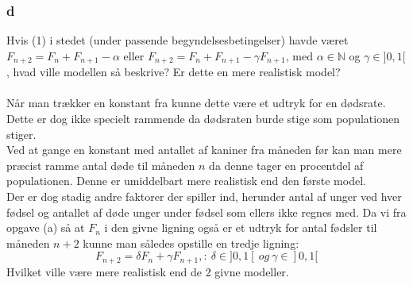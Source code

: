 \documentclass[12pt]{article}
\begin{document}
\subsubsection*{d}
Hvis (1) i stedet (under passende begyndelsesbetingelser) havde været $F_{n+2}=F_n+F_{n+1}-\alpha$ eller $F_{n+2}=F_n+F_{n+1}-\gamma F_{n+1}$, med $\alpha\in \mathbb{N}$ og $\gamma\in ]0,1[$, hvad ville modellen så beskrive? Er dette en mere realistisk model?\\
\\
Når man trækker en konstant fra kunne dette være et udtryk for en dødsrate. Dette er dog ikke specielt rammende da dødsraten burde stige som populationen stiger.\\
Ved at gange en konstant med antallet af kaniner fra måneden før kan man mere præcist ramme antal døde til måneden $n$ da denne tager en procentdel af populationen. Denne er umiddelbart mere realistisk end den første model.\\
Der er dog stadig andre faktorer der spiller ind, herunder antal af unger ved hver fødsel og antallet af døde unger under fødsel som ellers ikke regnes med. Da vi fra opgave (a) så at $F_n$ i den givne ligning også er et udtryk for antal fødsler til måneden $n+2$ kunne man således opstille en tredje ligning:
$$F_{n+2}=\delta F_n+\gamma F_{n+1},:\ \delta\in ]0,1[\:og\:\gamma\in ]0,1[$$
Hvilket ville være mere realistisk end de 2 givne modeller.
\end{document}
